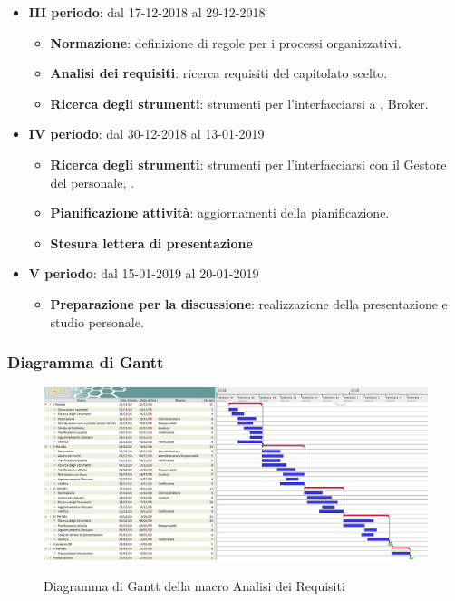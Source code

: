 \begin{itemize}
\begin{itemize}
			\end{itemize}
        	\item \textbf{III periodo}: dal 17-12-2018 al 29-12-2018
			\begin{itemize}
    	        \item \textbf{Normazione}: definizione di regole per i processi organizzativi.
    	        \item \textbf{Analisi dei requisiti}: ricerca requisiti del capitolato scelto.
       	        \item \textbf{Ricerca degli strumenti}: strumenti per l'interfacciarsi a , Broker.
        	\end{itemize}
        	\item \textbf{IV periodo}: dal 30-12-2018 al 13-01-2019
        	\begin{itemize}
       	        \item \textbf{Ricerca degli strumenti}: strumenti per l'interfacciarsi con il Gestore del personale, .
       	        \item \textbf{Pianificazione attività}: aggiornamenti della pianificazione.
       	        \item \textbf{Stesura lettera di presentazione}
        	\end{itemize}
        	\item \textbf{V periodo}: dal 15-01-2019 al 20-01-2019
        	\begin{itemize}
    	        \item \textbf{Preparazione per la discussione}: realizzazione della presentazione e studio personale.
        	\end{itemize}
		\end{itemize}
		
        \begin{landscape}
			\subsubsection{Diagramma di Gantt}        
			\begin{figure}[H]
					\centering
					\includegraphics[scale=0.42]{img/Analisi_dei_requisiti.png}\\
					\caption{Diagramma di Gantt della macro Analisi dei Requisiti}
			\end{figure}
		\end{landscape}
	
